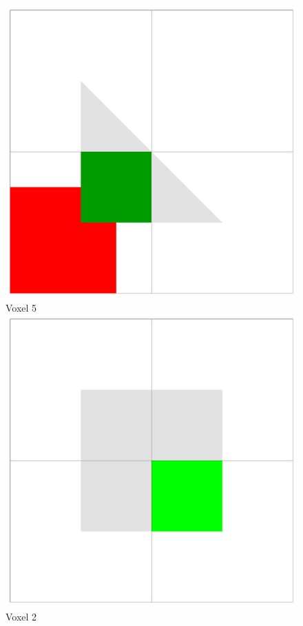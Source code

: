 \begin{figure}[!htb]
  \includegraphics[width=\linewidth]{drawings/cubes_05.pdf}
  Voxel 5
\endminipage\hfill
{}
  \includegraphics[width=\linewidth]{drawings/cubes_02.pdf}
  Voxel 2
  

\end{figure}

